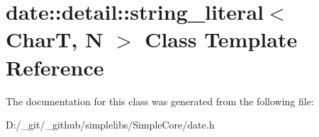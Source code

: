 \hypertarget{classdate_1_1detail_1_1string__literal}{}\section{date\+::detail\+::string\+\_\+literal$<$ CharT, N $>$ Class Template Reference}
\label{classdate_1_1detail_1_1string__literal}


The documentation for this class was generated from the following file\+:\begin{DoxyCompactItemize}
\item 
D\+:/\+\_\+git/\+\_\+github/simplelibs/\+Simple\+Core/date.\+h\end{DoxyCompactItemize}
